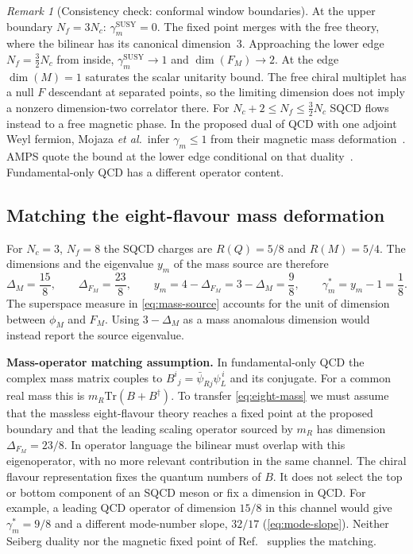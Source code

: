 \documentclass[11pt,a4paper]{article}
\theoremstyle{plain}
\theoremstyle{definition}
\theoremstyle{remark}
\newtheorem{remark}[theorem]{Remark}
\newcommand{\Nc}{N_{\!c}}
\newcommand{\Nf}{N_{\!f}}
\newcommand{\Tr}{\mathrm{Tr}}
\begin{document}

\begin{remark}[Consistency check: conformal window boundaries]
  At the upper boundary $\Nf = 3\Nc$: $\gamma_m^{\mathrm{SUSY}} = 0$.
  The fixed point merges with the free theory, where the bilinear has
  its canonical dimension~$3$.  Approaching the lower edge
  $\Nf=\frac32\Nc$ from inside, $\gamma_m^{\mathrm{SUSY}}\to1$ and
  $\dim(F_M)\to2$.  At the edge $\dim(M)=1$ saturates the scalar
  unitarity bound.  The free chiral multiplet has a null $F$ descendant
  at separated points, so the limiting dimension does not imply a
  nonzero dimension-two correlator there.  For
  $\Nc + 2 \le \Nf \le \tfrac{3}{2}\Nc$ SQCD flows instead to a free
  magnetic phase. In the proposed dual of QCD with one adjoint Weyl
  fermion, Mojaza \textit{et al.}\ infer $\gamma_m\le1$ from their
  magnetic mass deformation~\cite[Eq.~(47) and following text]{MNPS2011}.
  AMPS quote the bound at the lower edge conditional on that
  duality~\cite[Sec.~II]{AMPS2013}. Fundamental-only QCD has a
  different operator content.
\end{remark}

\subsection{Matching the eight-flavour mass deformation}
\label{ssec:mass-map}

For $\Nc=3$, $\Nf=8$ the SQCD charges are $R(Q)=5/8$ and $R(M)=5/4$.
The dimensions and the eigenvalue $y_m$ of the mass source are therefore
\begin{equation}\label{eq:eight-mass}
  \Delta_M=\frac{15}{8},\qquad \Delta_{F_M}=\frac{23}{8},\qquad
  y_m=4-\Delta_{F_M}=3-\Delta_M=\frac98,\qquad
  \gamma_m^*=y_m-1=\frac18 .
\end{equation}
The superspace measure in \cref{eq:mass-source} accounts for the unit
of dimension between $\phi_M$ and $F_M$.  Using $3-\Delta_M$ as a
mass anomalous dimension would instead report the source eigenvalue.

\textbf{Mass-operator matching assumption.}  In fundamental-only QCD
the complex mass matrix couples to $B^i{}_j=\bar\psi_{Rj}\psi_L^{\,i}$
and its conjugate.  For a common real mass this is
$m_R\Tr(B+B^\dagger)$.  To transfer \cref{eq:eight-mass} we must assume
that the massless eight-flavour theory reaches a fixed point at the
proposed boundary and that the leading scaling operator sourced by
$m_R$ has dimension $\Delta_{F_M}=23/8$.  In operator language the
bilinear must overlap with this eigenoperator, with no more relevant
contribution in the same channel.  The chiral flavour representation
fixes the quantum numbers of $B$.  It does not select the top or bottom
component of an SQCD meson or fix a dimension in QCD.  For example,
a leading QCD operator of dimension $15/8$ in this channel would give
$\gamma_m^*=9/8$ and a different mode-number slope, $32/17$
(\cref{eq:mode-slope}).  Neither Seiberg duality nor the magnetic
fixed point of Ref.~\cite{AMPS2013} supplies the matching.
\end{document}
